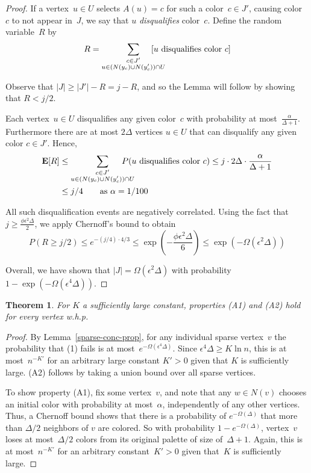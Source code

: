 \documentclass[11pt]{amsart}
\newtheorem{theorem}{Theorem}[section]
\newcommand{\bE}{\ensuremath{\mathbf{E}}}
\begin{document}
\begin{proof}
If a vertex~$u \in U$ selects $A(u) = c$ for such a color~$c \in J'$, causing color~$c$ to not appear in~$J$, we say that $u$ \emph{disqualifies} color~$c$. Define the random variable~$R$ by
$$
R = \sum_{\substack{c \in J' \\ u \in (N(y_c) \cup N(y'_c))\cap U}} \negthickspace \negthickspace \negthickspace \negthickspace \negthickspace \negthickspace [ \text{$u$ disqualifies color $c$}]
$$

Observe that $|J| \geq |J'| - R = j - R$, and so the Lemma will follow by showing that $R < j/2$.

Each vertex~$u \in U$ disqualifies any given color~$c$ with probability at most~$\frac{\alpha}{\Delta+1}$. Furthermore there are at most $2 \Delta$ vertices $u \in U$ that can disqualify any given color $c \in J'$. Hence,
\begin{align*}
\bE[R] &\leq \sum_{\substack{c \in J' \\ u \in (N(y_c) \cup N(y'_c))\cap U}} \negthickspace \negthickspace \negthickspace \negthickspace \negthickspace \negthickspace P( \text{$u$ disqualifies color $c$}) \leq j \cdot 2 \Delta \cdot \frac{\alpha}{\Delta+1} \\
& \leq j/4 \qquad \text{as $\alpha = 1/100$}
\end{align*}

All such disqualification events are negatively correlated. Using the fact that $j \geq \frac{\phi \epsilon^2 \Delta}{2}$, we apply Chernoff's bound to obtain
$$
P( R \geq j/2)\leq e^{-(j/4) \cdot 4 / 3} \leq \exp(-\frac{\phi \epsilon^2 \Delta}{6}) \leq \exp(-\Omega(\epsilon^2 \Delta))
$$

Overall, we have shown that $|J| = \Omega(\epsilon^2 \Delta)$ with probability $1 - \exp(-\Omega(\epsilon^4 \Delta))$.
\end{proof}

\begin{theorem}
\label{initial-coloring-good-prop}
For $K$ a sufficiently large constant, properties (A1) and (A2) hold for every vertex w.h.p.
\end{theorem}
\begin{proof}
By Lemma~\ref{sparse-conc-prop}, for any individual sparse vertex~$v$ the probability that (1) fails is at most~$e^{-\Omega(\epsilon^4 \Delta)}$. Since $\epsilon^4 \Delta \geq K \ln n$, this is at most~$n^{-K'}$ for an arbitrary large constant $K'>0$ given that $K$ is sufficiently large. (A2) follows by taking a union bound over all sparse vertices.

To show property (A1), fix some vertex~$v$, and note that any $w \in N(v)$ chooses an initial color with probability at most~$\alpha$, independently of any other vertices. Thus, a Chernoff bound shows that there is a probability of $e^{-\Omega(\Delta)}$ that more than $\Delta/2$ neighbors of $v$ are colored. So with probability $1 - e^{-\Omega(\Delta)}$, vertex~$v$ loses at most~$\Delta/2$ colors from its original palette of size of~$\Delta+1$. Again, this is at most~$n^{-K'}$ for an arbitrary constant~$K'>0$ given that~$K$ is sufficiently large.
\end{proof}
\end{document}
